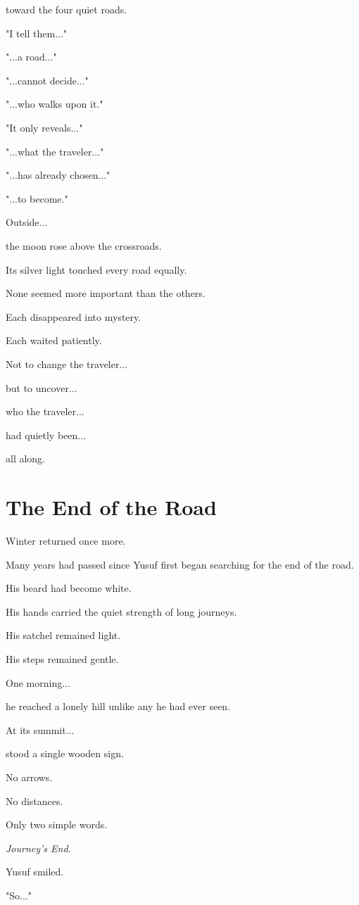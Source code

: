 \documentclass[12pt,openany]{book}
\begin{document}
toward the four quiet roads.

"I tell them..."

"...a road..."

"...cannot decide..."

"...who walks upon it."

"It only reveals..."

"...what the traveler..."

"...has already chosen..."

"...to become."

Outside...

the moon rose above the crossroads.

Its silver light touched every road equally.

None seemed more important than the others.

Each disappeared into mystery.

Each waited patiently.

Not to change the traveler...

but to uncover...

who the traveler...

had quietly been...

all along.
\section*{The End of the Road}

Winter returned once more.

Many years had passed since Yusuf first began searching for the end of the road.

His beard had become white.

His hands carried the quiet strength of long journeys.

His satchel remained light.

His steps remained gentle.

One morning...

he reached a lonely hill unlike any he had ever seen.

At its summit...

stood a single wooden sign.

No arrows.

No distances.

Only two simple words.

\emph{Journey's End.}

Yusuf smiled.

"So..."
\end{document}
